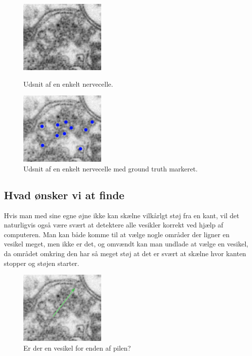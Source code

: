 \begin{figure}[H]
	\begin{minipage}[b]{0.5\linewidth}
		\centering
		\includegraphics[scale=1.5]{files/intro/img/celle.png}
		\caption{Udsnit af en enkelt nervecelle.\label{fig:intro_celle}}
	\end{minipage}
	\hspace{0.5cm}
	\begin{minipage}[b]{0.5\linewidth}
		\centering
		\includegraphics[scale=1.5]{files/intro/img/celle_groundtruth.png}
		\caption{Udsnit af en enkelt nervecelle med ground truth markeret.\label{fig:intro_celle_groundtruth}}
	\end{minipage}
\end{figure}
  

\subsection{Hvad ønsker vi at finde}
Hvis man med sine egne øjne ikke kan skælne vilkårlgt støj fra en kant, vil det naturligvis også være svært at detektere alle vesikler korrekt ved hjælp af computeren. Man kan både komme til at vælge nogle områder der ligner en vesikel meget, men ikke er det, og omvændt kan man undlade at vælge en vesikel, da området omkring den har så meget støj at det er svært at skælne hvor kanten stopper og støjen starter. 

\begin{figure}[H]
	\centering
	\includegraphics[scale=1.5]{files/intro/img/celle_questionves.png}
	\caption{Er der en vesikel for enden af pilen?\label{fig:intro_celle_question}}
\end{figure}

